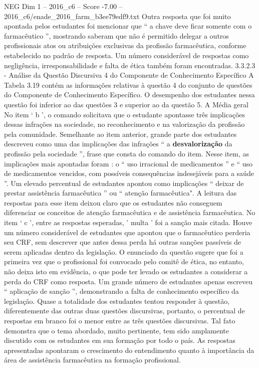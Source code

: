\begin{textsample}{NEG Dim 1 – 2016\_c6 – Score -7.00 – 2016\_c6/enade\_2016\_farm\_b3ee79edf9.txt}
Outra resposta que foi muito apontada pelos estudantes foi mencionar que “ a chave deve ficar somente com o farmacêutico ”, mostrando saberam que não é permitido delegar a outros profissionais atos ou atribuições exclusivas da profissão farmacêutica, conforme estabelecido no padrão de resposta.
Um número considerável de respostas como negligência, irresponsabilidade e falta de ética também foram encontradas. 3.3.2.3 - Análise da Questão Discursiva 4 do Componente de Conhecimento Específico A Tabela 3.19 contém as informações relativas à questão 4 do conjunto de questões do Componente de Conhecimento Específico.
O desempenho dos estudantes nessa questão foi inferior ao das questões 3 e superior ao da questão 5.
A Média geral No item ‘ b ’, o comando solicitava que o estudante apontasse três implicações dessas infrações na sociedade, no reconhecimento e na valorização da profissão pela comunidade.
Semelhante ao item anterior, grande parte dos estudantes descreveu como uma das implicações das infrações “ a \textbf{desvalorização} da profissão pela sociedade ”, frase que consta do comando do item.
Nesse item, as implicações mais apontadas foram : o “ uso irracional de medicamentos ” e “ uso de medicamentos vencidos, com possíveis consequências indesejáveis para a saúde ”.
Um elevado percentual de estudantes apontou como implicações “ deixar de prestar assistência farmacêutica ” ou “ atenção farmacêutica".
A leitura das respostas para esse item deixou claro que os estudantes não conseguem diferenciar os conceitos de atenção farmacêutica e de assistência farmacêutica.
No item ‘ c ’, entre as respostas esperadas, ' multa ' foi a sanção mais citada.
Houve um número considerável de estudantes que apontou que o farmacêutico perderia seu CRF, sem descrever que antes dessa perda há outras sanções passíveis de serem aplicadas dentro da legislação.
O enunciado da questão sugere que foi a primeira vez que o profissional foi convocado pelo comitê de ética, no entanto, não deixa isto em evidência, o que pode ter levado os estudantes a considerar a perda do CRF como resposta.
Um grande número de estudantes apenas escreveu “ aplicação de sanção ”, demonstrando a falta de conhecimento específico da legislação.
Quase a totalidade dos estudantes tentou responder à questão, diferentemente das outras duas questões discursivas, portanto, o percentual de respostas em branco foi o menor entre as três questões discursivas.
Tal fato demonstra que o tema abordado, muito pertinente, tem sido amplamente discutido com os estudantes em sua formação por todo o país.
As respostas apresentadas apontaram o crescimento do entendimento quanto à importância da área de assistência farmacêutica na formação profissional.

\end{textsample}
